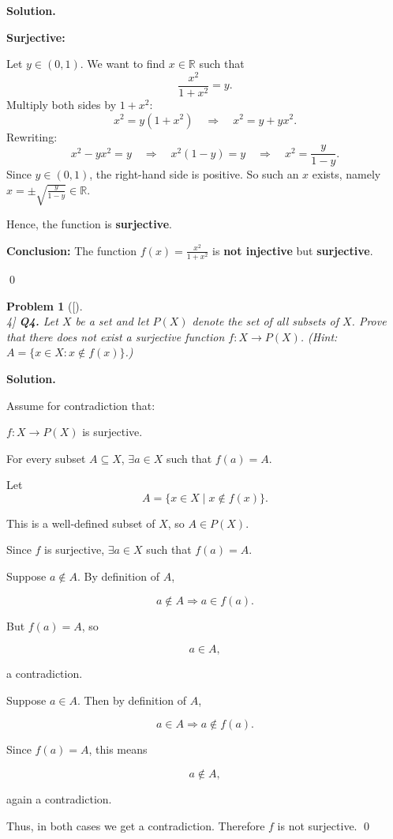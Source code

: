 \documentclass[12pt]{article}
\newtheorem{problemx}{Problem}
\newenvironment{problem}[1]{%
	\begin{problemx}[#1]\leavevmode\\[0.5em] %
	}{%
	\end{problemx}
}
\newenvironment{solution}{%
	\par\medskip
	\noindent\textbf{Solution.}\par\nopagebreak
}{%
	\hfill \qed \par\medskip
}
\begin{document}
\begin{solution}
\textbf{Surjective:}

Let \( y \in (0, 1) \). We want to find \( x \in \mathbb{R} \) such that
\[
\frac{x^2}{1 + x^2} = y.
\]
Multiply both sides by \( 1 + x^2 \):
\[
x^2 = y(1 + x^2) \quad \Rightarrow \quad x^2 = y + yx^2.
\]
Rewriting:
\[
x^2 - yx^2 = y \quad \Rightarrow \quad x^2(1 - y) = y \quad \Rightarrow \quad x^2 = \frac{y}{1 - y}.
\]
Since \( y \in (0, 1) \), the right-hand side is positive. So such an \( x \) exists, namely \( x = \pm \sqrt{\frac{y}{1 - y}} \in \mathbb{R} \).

Hence, the function is \textbf{surjective}.

\medskip

\noindent\textbf{Conclusion:} The function \( f(x) = \frac{x^2}{1 + x^2} \) is \textbf{not injective} but \textbf{surjective}.


	\end{solution}
	
	\begin{problem}[4]
		\textbf{Q4.} Let $X$ be a set and let $P(X)$ denote the set of all subsets of $X$. Prove that there does not exist a surjective function $f: X \to P(X)$. (Hint: $A = \{ x \in X : x \notin f(x) \}$.)
	\end{problem}
	
	\begin{solution}
Assume for contradiction that:

$f: X \to P(X)$ is surjective.

For every subset $A \subseteq X$, $\exists a \in X$ such that $f(a) = A$.

Let 
$$A = \{ x \in X \mid x \notin f(x) \}.$$

This is a well-defined subset of $X$, so $A \in P(X)$.

Since $f$ is surjective, $\exists a \in X$ such that $f(a) = A$.

Suppose $a \notin A$. By definition of $A$,

$$a \notin A \Rightarrow a \in f(a).$$

But $f(a) = A$, so 

$$a \in A,$$

a contradiction.

Suppose $a \in A$. Then by definition of $A$,

$$a \in A \Rightarrow a \notin f(a).$$

Since $f(a) = A$, this means 

$$a \notin A,$$

again a contradiction.

Thus, in both cases we get a contradiction. Therefore $f$ is not surjective.
	\end{solution}
	
\end{document}
